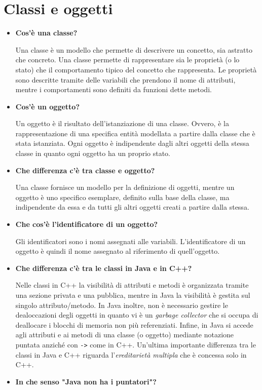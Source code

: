 \documentclass[12pt, a4paper]{article}
\begin{document}
\section{Classi e oggetti}
\begin{itemize}
    \item \textbf{Cos'è una classe?}
    
    Una classe è un modello che permette di descrivere un concetto, sia astratto
    che concreto. Una classe permette di rappresentare sia le proprietà (o lo stato)
    che il comportamento tipico del concetto che rappresenta. Le proprietà sono
    descritte tramite delle variabili che prendono il nome di attributi, mentre 
    i comportamenti sono definiti da funzioni dette metodi.
    \item \textbf{Cos'è un oggetto?}
    
    Un oggetto è il risultato dell'istanziazione di una classe. Ovvero, è la
    rappresentazione di una specifica entità modellata a partire dalla classe
    che è stata istanziata. Ogni oggetto è indipendente dagli altri oggetti
    della stessa classe in quanto ogni oggetto ha un proprio stato.
    \item \textbf{Che differenza c'è tra classe e oggetto?}
    
    Una classe fornisce un modello per la definizione di oggetti, mentre un
    oggetto è uno specifico esemplare, definito sulla base della classe,
    ma indipendente da essa e da tutti gli altri oggetti creati a partire
    dalla stessa.
    \item \textbf{Che cos'è l'identificatore di un oggetto?}
    
    Gli identificatori sono i nomi assegnati alle variabili. L'identificatore di
    un oggetto è quindi il nome assegnato al riferimento di quell'oggetto.
    \item \textbf{Che differenza c'è tra le classi in Java e in C++?}
    
    Nelle classi in C++ la visibilità di attributi e metodi è organizzata tramite
    una sezione privata e una pubblica, mentre in Java la visibilità è gestita
    sul singolo attributo/metodo. In Java inoltre, non è necessario gestire le
    dealoccazioni degli oggetti in quanto vi è un \emph{garbage collector}
    che si occupa di deallocare i blocchi di memoria non più referenziati.
    Infine, in Java si accede agli attributi e ai metodi di una classe (o oggetto)
    mediante notazione puntata anziché con \texttt{->} come in C++.
    Un'ultima importante differenza tra le classi in Java e C++ riguarda
    l'\emph{ereditarietà multipla} che è concessa solo in C++.
    \item \textbf{In che senso "Java non ha i puntatori"?}
    

\end{itemize}
\end{document}
